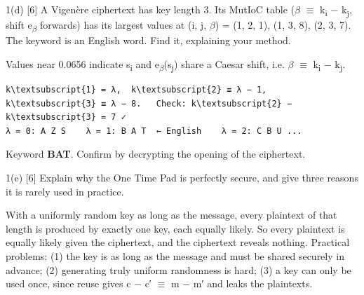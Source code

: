 \documentclass[11pt,a4paper]{article}
\begin{document}
\begin{question}{1(d) \hfill\textnormal{\small [6]}}
A Vigenère ciphertext has key length 3. Its MutIoC table (\ensuremath{\beta} \ensuremath{\equiv} k\textsubscript{i} \ensuremath{-} k\textsubscript{j}, shift e\textsubscript{\ensuremath{\beta}} forwards) has its largest values at (i, j, \ensuremath{\beta}) = (1, 2, 1), (1, 3, 8), (2, 3, 7). The keyword is an English word. Find it, explaining your method.\par
\end{question}
\begin{answer}
Values near 0.0656 indicate s\textsubscript{i} and e\textsubscript{\ensuremath{\beta}}(s\textsubscript{j}) share a Caesar shift, i.e. \ensuremath{\beta} \ensuremath{\equiv} k\textsubscript{i} \ensuremath{-} k\textsubscript{j}.\par
\begin{workbox}
\begin{Verbatim}[commandchars=\\\{\},fontsize=\footnotesize]
k\textsubscript{1} = λ,  k\textsubscript{2} ≡ λ − 1,  k\textsubscript{3} ≡ λ − 8.   Check: k\textsubscript{2} − k\textsubscript{3} = 7 ✓
λ = 0: A Z S    λ = 1: B A T  ← English    λ = 2: C B U ...
\end{Verbatim}
\end{workbox}
Keyword \textbf{BAT}. Confirm by decrypting the opening of the ciphertext.\par
\end{answer}
\begin{question}{1(e) \hfill\textnormal{\small [6]}}
Explain why the One Time Pad is perfectly secure, and give three reasons it is rarely used in practice.\par
\end{question}
\begin{answer}
With a uniformly random key as long as the message, every plaintext of that length is produced by exactly one key, each equally likely. So every plaintext is equally likely given the ciphertext, and the ciphertext reveals nothing. Practical problems: (1) the key is as long as the message and must be shared securely in advance; (2) generating truly uniform randomness is hard; (3) a key can only be used once, since reuse gives c \ensuremath{-} c′ \ensuremath{\equiv} m \ensuremath{-} m′ and leaks the plaintexts.\par
\end{answer}
\end{document}
